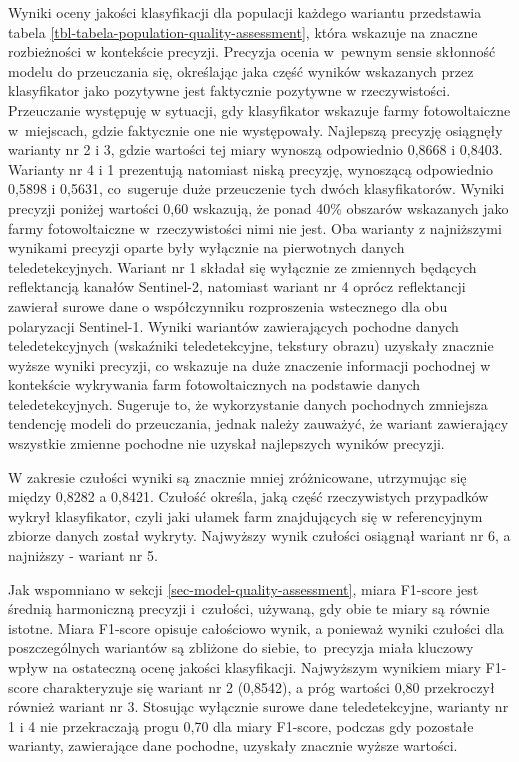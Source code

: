 \documentclass{amuthesis}
\begin{document}
Wyniki oceny jakości klasyfikacji dla populacji każdego wariantu
przedstawia tabela \ref{tbl-tabela-population-quality-assessment}, która
wskazuje na znaczne rozbieżności w kontekście precyzji. Precyzja ocenia
w~pewnym sensie skłonność modelu do przeuczania się, określając jaka
część wyników wskazanych przez klasyfikator jako pozytywne jest
faktycznie pozytywne w rzeczywistości. Przeuczanie występuję w sytuacji,
gdy klasyfikator wskazuje farmy fotowoltaiczne w~miejscach, gdzie
faktycznie one nie występowały. Najlepszą precyzję osiągnęły warianty nr
2 i 3, gdzie wartości tej miary wynoszą odpowiednio 0,8668 i 0,8403.
Warianty nr 4 i 1 prezentują natomiast niską precyzję, wynoszącą
odpowiednio 0,5898 i 0,5631, co~sugeruje duże przeuczenie tych dwóch
klasyfikatorów. Wyniki precyzji poniżej wartości 0,60 wskazują, że ponad
40\% obszarów wskazanych jako farmy fotowoltaiczne w~rzeczywistości nimi
nie jest. Oba warianty z najniższymi wynikami precyzji oparte były
wyłącznie na pierwotnych danych teledetekcyjnych. Wariant nr 1 składał
się wyłącznie ze zmiennych będących reflektancją kanałów Sentinel-2,
natomiast wariant nr 4 oprócz reflektancji zawierał surowe dane o
współczynniku rozproszenia wstecznego dla obu polaryzacji Sentinel-1.
Wyniki wariantów zawierających pochodne danych teledetekcyjnych
(wskaźniki teledetekcyjne, tekstury obrazu) uzyskały znacznie wyższe
wyniki precyzji, co wskazuje na duże znaczenie informacji pochodnej w
kontekście wykrywania farm fotowoltaicznych na podstawie danych
teledetekcyjnych. Sugeruje to, że wykorzystanie danych pochodnych
zmniejsza tendencję modeli do przeuczania, jednak należy zauważyć, że
wariant zawierający wszystkie zmienne pochodne nie uzyskał najlepszych
wyników precyzji.

W zakresie czułości wyniki są znacznie mniej zróżnicowane, utrzymując
się między 0,8282 a 0,8421. Czułość określa, jaką część rzeczywistych
przypadków wykrył klasyfikator, czyli jaki ułamek farm znajdujących się
w referencyjnym zbiorze danych został wykryty. Najwyższy wynik czułości
osiągnął wariant nr 6, a najniższy - wariant nr 5.

Jak wspomniano w sekcji \ref{sec-model-quality-assessment}, miara
F1-score jest średnią harmoniczną precyzji i~czułości, używaną, gdy obie
te miary są równie istotne. Miara F1-score opisuje całościowo wynik, a
ponieważ wyniki czułości dla poszczególnych wariantów są zbliżone do
siebie, to~precyzja miała kluczowy wpływ na ostateczną ocenę jakości
klasyfikacji. Najwyższym wynikiem miary F1-score charakteryzuje się
wariant nr 2 (0,8542), a próg wartości 0,80 przekroczył również wariant
nr 3. Stosując wyłącznie surowe dane teledetekcyjne, warianty nr 1 i 4
nie przekraczają progu 0,70 dla miary F1-score, podczas gdy pozostałe
warianty, zawierające dane pochodne, uzyskały znacznie wyższe wartości.
\end{document}

